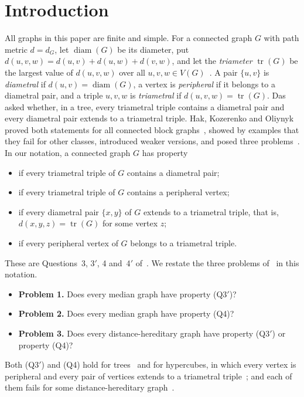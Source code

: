 \documentclass[11pt]{article}
\theoremstyle{remark}
\DeclareMathOperator{\diam}{diam}
\DeclareMathOperator{\tr}{tr}
\newcommand{\QA}{\textup{(Q3)}}
\newcommand{\QAp}{\textup{(Q3$'$)}}
\newcommand{\QB}{\textup{(Q4)}}
\newcommand{\QBp}{\textup{(Q4$'$)}}
\begin{document}
\section{Introduction}
All graphs in this paper are finite and simple. For a connected graph $G$ with
path metric $d=d_G$, let $\diam(G)$ be its diameter, put
$d(u,v,w)=d(u,v)+d(u,w)+d(v,w)$, and let the \emph{triameter} $\tr(G)$ be the
largest value of $d(u,v,w)$ over all $u,v,w\in V(G)$~\cite{das}. A pair
$\{u,v\}$ is \emph{diametral} if $d(u,v)=\diam(G)$, a vertex is
\emph{peripheral} if it belongs to a diametral pair, and a triple $u,v,w$ is
\emph{triametral} if $d(u,v,w)=\tr(G)$. Das~\cite{das} asked whether, in a
tree, every triametral triple contains a diametral pair and every diametral
pair extends to a triametral triple. Hak, Kozerenko and Oliynyk~\cite{hko}
proved both statements for all connected block graphs~\cite[Theorem~1.2]{hko},
showed by examples that they fail for other classes, introduced weaker
versions, and posed three problems~\cite[Section~4]{hko}. In our notation, a
connected graph $G$ has property
\begin{itemize}[nosep]
\item[\QA] if every triametral triple of $G$ contains a diametral pair;
\item[\QAp] if every triametral triple of $G$ contains a peripheral vertex;
\item[\QB] if every diametral pair $\{x,y\}$ of $G$ extends to a triametral
 triple, that is, $d(x,y,z)=\tr(G)$ for some vertex $z$;
\item[\QBp] if every peripheral vertex of $G$ belongs to a triametral triple.
\end{itemize}
These are Questions~3, 3$'$, 4 and~4$'$ of~\cite{hko}. We restate the three
problems of~\cite[Section~4]{hko} in this notation.
\begin{itemize}[nosep]
\item[] \textbf{Problem 1.} Does every median graph have property \QAp?
\item[] \textbf{Problem 2.} Does every median graph have property \QB?
\item[] \textbf{Problem 3.} Does every distance-hereditary graph have property
 \QAp{} or property \QB?
\end{itemize}
Both \QAp{} and \QB{} hold for trees~\cite[Theorem~1.2]{hko} and for
hypercubes, in which every vertex is peripheral and every pair of vertices
extends to a triametral triple~\cite[Corollary~2.5]{hko}; and each of them
fails for some distance-hereditary graph~\cite[Figure~3]{hko}.
\end{document}
